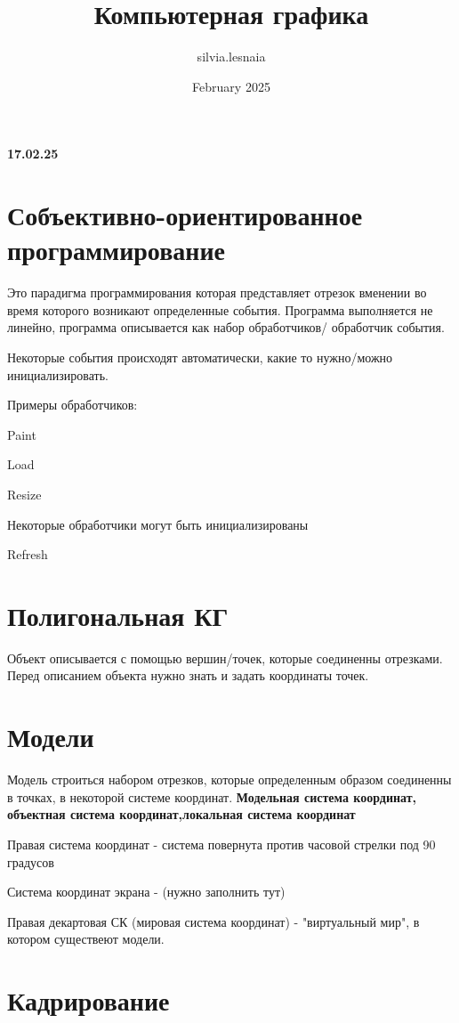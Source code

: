 \documentclass{article}
\title{Компьютерная графика}
\author{silvia.lesnaia }
\date{February 2025}
\begin{document}
\maketitle

\textbf{17.02.25}

\section{Собъективно-ориентированное программирование}

Это парадигма программирования которая представляет отрезок вменении во время которого возникают определенные события. Программа выполняется не линейно, программа описывается как набор обработчиков/ обработчик события.

Некоторые события происходят автоматически, какие то нужно/можно инициализировать.

Примеры обработчиков:

Paint

Load

Resize

\vspace{5mm}

Некоторые обработчики могут быть инициализированы

Refresh

\section{Полигональная КГ}

Объект описывается с помощью вершин/точек, которые соединенны отрезками. Перед описанием объекта нужно знать и задать координаты точек.

\section{Модели}

Модель строиться набором отрезков, которые определенным образом соединенны в точках, в некоторой системе координат. \textbf{Модельная система координат, объектная система координат,локальная система координат}

Правая система координат - система повернута против часовой стрелки под 90 градусов

Система координат экрана - (нужно заполнить тут) 

Правая декартовая СК (мировая система координат) - "виртуальный мир", в котором существеют модели.

\section{Кадрирование}
\end{document}
